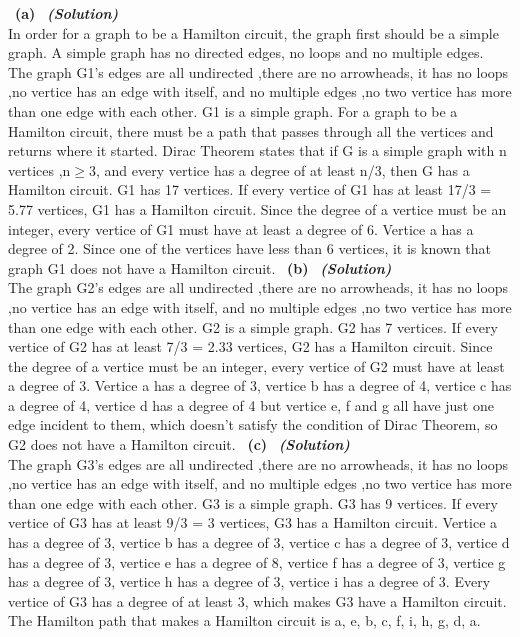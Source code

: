 \documentclass[a4 paper]{article}
\numberwithin{equation}{section}
\newcommand{\subproblem}[1]{~\newline\textbf{(#1)}}
\newcommand{\solution}{~\newline\textbf{\textit{(Solution)}} }
\newcommand{\0}{\mathbf{0}}
\begin{document}
\subproblem{a} \solution\\
In order for a graph to be a Hamilton circuit, the graph first should be a simple graph. A simple graph has no directed edges, no loops and no multiple edges. The graph G1's edges are all undirected ,there are no arrowheads, it has no loops ,no vertice has an edge with itself, and no multiple edges ,no two vertice has more than one edge with each other. G1 is a simple graph. For a graph to be a Hamilton circuit, there must be a path that passes through all the vertices and returns where it started. Dirac Theorem states that if G is a simple graph with n vertices ,n$\geq$3, and every vertice has a degree of at least n/3, then G has a Hamilton circuit. G1 has 17 vertices. If every vertice of G1 has at least 17/3 = 5.77 vertices, G1 has a Hamilton circuit. Since the degree of a vertice must be an integer, every vertice of G1 must have at least a degree of 6. Vertice a has a degree of 2. Since one of the vertices have less than 6 vertices, it is known that graph G1 does not have a Hamilton circuit.
\subproblem{b} \solution\\
The graph G2's edges are all undirected ,there are no arrowheads, it has no loops ,no vertice has an edge with itself, and no multiple edges ,no two vertice has more than one edge with each other. G2 is a simple graph. G2 has 7 vertices. If every vertice of G2 has at least 7/3 = 2.33 vertices, G2 has a Hamilton circuit. Since the degree of a vertice must be an integer, every vertice of G2 must have at least a degree of 3. Vertice a has a degree of 3, vertice b has a degree of 4, vertice c has a degree of 4, vertice d has a degree of 4 but vertice e, f and g all have just one edge incident to them, which doesn't satisfy the condition of Dirac Theorem, so G2 does not have a Hamilton circuit.
\subproblem{c} \solution\\
The graph G3's edges are all undirected ,there are no arrowheads, it has no loops ,no vertice has an edge with itself, and no multiple edges ,no two vertice has more than one edge with each other. G3 is a simple graph. G3 has 9 vertices. If every vertice of G3 has at least 9/3 = 3 vertices, G3 has a Hamilton circuit. Vertice a has a degree of 3, vertice b has a degree of 3, vertice c has a degree of 3, vertice d has a degree of 3, vertice e has a degree of 8, vertice f has a degree of 3, vertice g has a degree of 3, vertice h has a degree of 3, vertice i has a degree of 3. Every vertice of G3 has a degree of at least 3, which makes G3 have a Hamilton circuit. The Hamilton path that makes a Hamilton circuit is a, e, b, c, f, i, h, g, d, a. 
\end{document}
